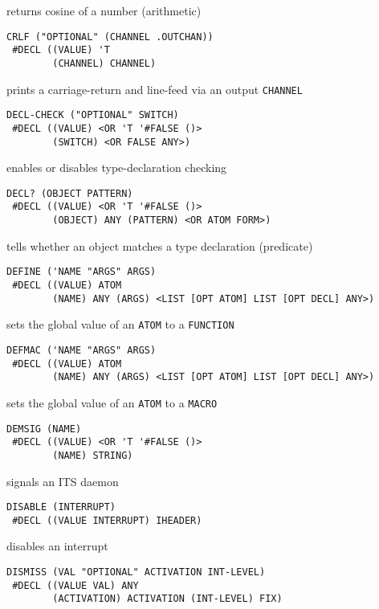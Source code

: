 \documentclass[a4paper,]{article}
\begin{document}
returns cosine of a number (arithmetic)

\begin{verbatim}
CRLF ("OPTIONAL" (CHANNEL .OUTCHAN))
 #DECL ((VALUE) 'T
        (CHANNEL) CHANNEL)
\end{verbatim}

prints a carriage-return and line-feed via an output \texttt{CHANNEL}

\begin{verbatim}
DECL-CHECK ("OPTIONAL" SWITCH)
 #DECL ((VALUE) <OR 'T '#FALSE ()>
        (SWITCH) <OR FALSE ANY>)
\end{verbatim}

enables or disables type-declaration checking

\begin{verbatim}
DECL? (OBJECT PATTERN)
 #DECL ((VALUE) <OR 'T '#FALSE ()>
        (OBJECT) ANY (PATTERN) <OR ATOM FORM>)
\end{verbatim}

tells whether an object matches a type declaration (predicate)

\begin{verbatim}
DEFINE ('NAME "ARGS" ARGS)
 #DECL ((VALUE) ATOM
        (NAME) ANY (ARGS) <LIST [OPT ATOM] LIST [OPT DECL] ANY>)
\end{verbatim}

sets the global value of an \texttt{ATOM} to a \texttt{FUNCTION}

\begin{verbatim}
DEFMAC ('NAME "ARGS" ARGS)
 #DECL ((VALUE) ATOM
        (NAME) ANY (ARGS) <LIST [OPT ATOM] LIST [OPT DECL] ANY>)
\end{verbatim}

sets the global value of an \texttt{ATOM} to a \texttt{MACRO}

\begin{verbatim}
DEMSIG (NAME)
 #DECL ((VALUE) <OR 'T '#FALSE ()>
        (NAME) STRING)
\end{verbatim}

signals an ITS daemon

\begin{verbatim}
DISABLE (INTERRUPT)
 #DECL ((VALUE INTERRUPT) IHEADER)
\end{verbatim}

disables an interrupt

\begin{verbatim}
DISMISS (VAL "OPTIONAL" ACTIVATION INT-LEVEL)
 #DECL ((VALUE VAL) ANY
        (ACTIVATION) ACTIVATION (INT-LEVEL) FIX)
\end{verbatim}
\end{document}
